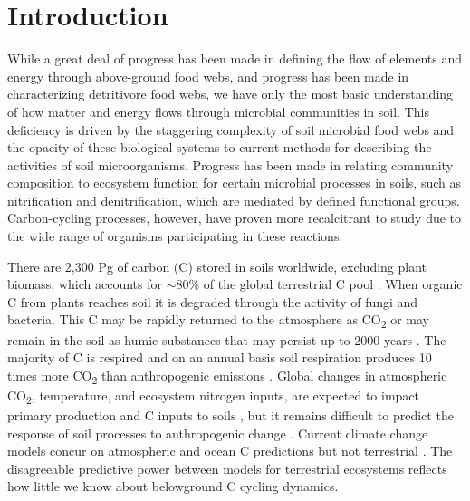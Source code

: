 \section{Introduction}
While a great deal of progress has been made in defining the flow of elements and energy through above-ground food webs, and progress has been made in characterizing detritivore food webs, we have only the most basic understanding of how matter and energy flows through microbial communities in soil. This deficiency is driven by the staggering complexity of soil microbial food webs and the opacity of these biological systems to current methods for describing the activities of soil microorganisms. Progress has been made in relating community composition to ecosystem function for certain microbial processes in soils, such as nitrification and denitrification, which are mediated by defined functional groups. Carbon-cycling processes, however, have proven more recalcitrant to study due to the wide range of organisms participating in these reactions.
 
There are 2,300 Pg of carbon (C) stored in soils worldwide, excluding plant biomass, which accounts for $\sim$80\% of the global terrestrial C pool \cite{Amundson_2001,Mendelsohn_2001,IPCC2007Synth,elsen_Ayres_Wall_Bardgett_2011,Lal_2008,BATJES_1996,Lal_2008}. When organic C from plants reaches soil it is degraded through the activity of fungi and bacteria. This C may be rapidly returned to the atmosphere as CO\textsubscript{2} or may remain in the soil as humic substances that may persist up to 2000 years \cite{yanagita1990natural}. The majority of C is respired and on an annual basis soil respiration produces 10 times more CO\textsubscript{2} than anthropogenic emissions \cite{chapin2002principles}. Global changes in atmospheric CO\textsubscript{2}, temperature, and ecosystem nitrogen inputs, are expected to impact primary production and C inputs to soils \cite{Groenigen_2006}, but it remains difficult to predict the response of soil processes to anthropogenic change \cite{DAVIDSON_2006}. Current climate change models concur on atmospheric and ocean C predictions but not terrestrial \cite{Friedlingstein_2006}. The disagreeable predictive power between models for terrestrial ecosystems reflects how little we know about belowground C cycling dynamics. 

